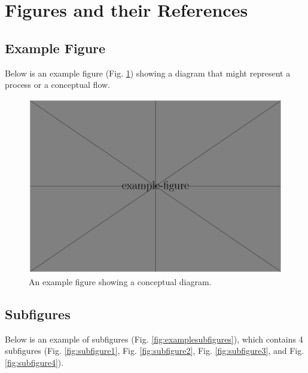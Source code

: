 \documentclass[a4paper]{article}
\begin{document}
\section{Figures and their References}

\subsection{Example Figure}

Below is an example figure (Fig. \ref{fig:examplefig}) showing a diagram that might represent a process or a conceptual flow.

\begin{figure}[htbp]
    \centering
    \includegraphics[width=0.8\linewidth]{example-figure}
    \caption{
        An example figure showing a conceptual diagram.
    }
    \label{fig:examplefig}
\end{figure}

\subsection{Subfigures}

Below is an example of subfigures (Fig. \ref{fig:examplesubfigures}), which contains 4 subfigures (Fig. \ref{fig:subfigure1}, Fig. \ref{fig:subfigure2}, Fig. \ref{fig:subfigure3}, and Fig. \ref{fig:subfigure4}).
\end{document}
